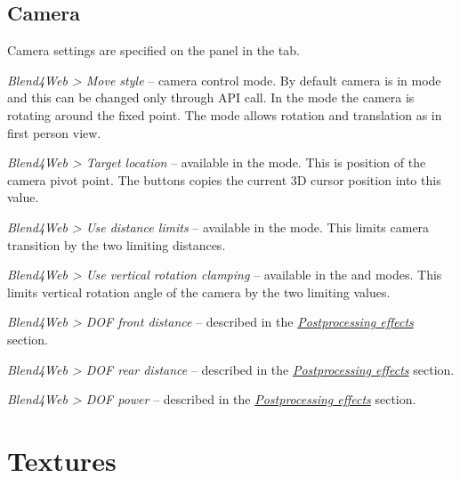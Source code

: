 \documentclass[a4paper,12pt,oneside]{sphinxmanual}
\begin{document}
\section{Camera}
\label{objects:id4}
Camera settings are specified on the  panel in the  tab.

\emph{Blend4Web \textgreater{} Move style} -- camera control mode. By default camera is in  mode and this can be changed only through API call. In the  mode the camera is rotating around the fixed point. The  mode allows rotation and translation as in first person view.

\emph{Blend4Web \textgreater{} Target location} -- available in the  mode. This is position of the camera pivot point. The  buttons copies the current 3D cursor position into this value.

\emph{Blend4Web \textgreater{} Use distance limits} -- available in the  mode. This limits camera transition by the two limiting distances.

\emph{Blend4Web \textgreater{} Use vertical rotation clamping} -- available in the  and  modes. This limits vertical rotation angle of the camera by the two limiting values.

\emph{Blend4Web \textgreater{} DOF front distance} -- described in the {\hyperref[postprocessing_effects:postprocessing-effects]{\emph{Postprocessing effects}}} section.

\emph{Blend4Web \textgreater{} DOF rear distance} -- described in the {\hyperref[postprocessing_effects:postprocessing-effects]{\emph{Postprocessing effects}}} section.

\emph{Blend4Web \textgreater{} DOF power} -- described in the {\hyperref[postprocessing_effects:postprocessing-effects]{\emph{Postprocessing effects}}} section.
\label{textures:textures}

\chapter{Textures}
\label{textures:index-0}\label{textures::doc}\label{textures:id1}
\end{document}
